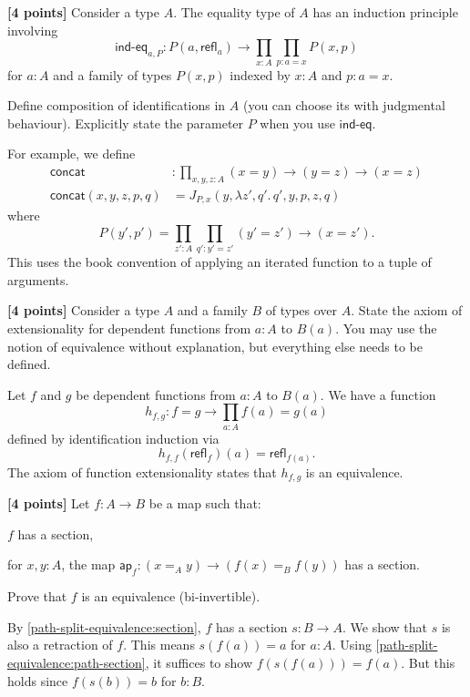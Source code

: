 \documentclass[11pt]{article}
\newcommand{\ap}{\mathsf{ap}}
\newcommand{\refl}{\mathsf{refl}}
\newcommand{\concat}{\mathsf{concat}}
\newcommand{\indeq}{\mathsf{ind\mbox{-}eq}}
\begin{document}
\begin{problems}

\item \label{path-associative}
\textbf{[4 points]}
Consider a type $A$.
The equality type of $A$ has an induction principle involving
\[
\indeq_{a,P} : P(a, \refl_a) \to \prod_{x : A} \prod_{p : a = x} P(x, p)
\]
for $a : A$ and a family of types $P(x, p)$ indexed by $x : A$ and $p : a = x$.

Define composition of identifications in $A$ (you can choose its with judgmental behaviour).
Explicitly state the parameter $P$ when you use $\indeq$.

{\color{purple}
For example, we define
\begin{align*}
\concat &: \prod_{x, y, z : A} (x = y) \to (y = z) \to (x = z)
\\
\concat(x, y, z, p, q) &= J_{P,x}(y, \lambda z', q'.\, q', y, p, z, q)
\end{align*}
where
\[
P(y', p') = \prod_{z' : A} \prod_{q' : y' = z'} (y' = z') \to (x = z')
.\]
This uses the book convention of applying an iterated function to a tuple of arguments.
}

\item \label{function-extensionality}
\textbf{[4 points]}
Consider a type $A$ and a family $B$ of types over $A$.
State the axiom of extensionality for dependent functions from $a : A$ to $B(a)$.
You may use the notion of equivalence without explanation, but everything else needs to be defined.

{\color{purple}
Let $f$ and $g$ be dependent functions from $a : A$ to $B(a)$.
We have a function
\[
h_{f, g} : f = g \to \prod_{a : A} f(a) = g(a)
\]
defined by identification induction via
\[
h_{f, f}(\refl_f)(a) = \refl_{f(a)}
.\]
The axiom of function extensionality states that $h_{f, g}$ is an equivalence.
}

\item \label{path-split-equivalence}
\textbf{[4 points]}
Let $f : A \to B$ be a map such that:
\begin{conditions}
\item \label{path-split-equivalence:section} $f$ has a section,
\item \label{path-split-equivalence:path-section} for $x, y : A$, the map $\ap_f : (x =_A y) \to (f(x) =_B f(y))$ has a section.
\end{conditions}
Prove that $f$ is an equivalence (bi-invertible).

{\color{purple}
By \cref{path-split-equivalence:section}, $f$ has a section $s : B \to A$.
We show that $s$ is also a retraction of $f$.
This means $s(f(a)) = a$ for $a : A$.
Using \cref{path-split-equivalence:path-section}, it suffices to show $f(s(f(a))) = f(a)$.
But this holds since $f(s(b)) = b$ for $b : B$.
}


\end{problems}
\end{document}
